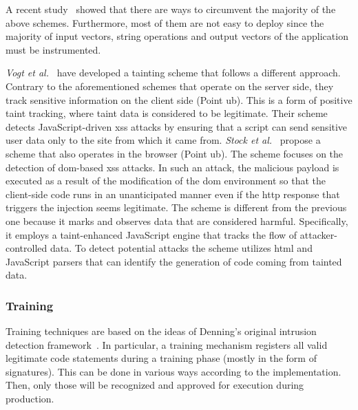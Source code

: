 \documentclass[conference]{IEEEtran}
\begin{document}
A recent study~\cite{NBR14} showed that there are ways to circumvent
the majority of the above schemes. Furthermore, most of them are not
easy to deploy since the majority of input vectors, string operations
and output vectors of the application must be instrumented.

{\it Vogt et al.}~\cite{VFJKKV07} have developed a tainting scheme
that follows a different approach. Contrary to the aforementioned
schemes that operate on the server side, they track sensitive
information on the client side (Point {\sc ub}). This is a form of
positive taint tracking, where taint data is considered to be
legitimate. Their scheme detects JavaScript-driven {\sc xss} attacks
by ensuring that a script can send sensitive user data only to the
site from which it came from.
{\it Stock et al.}~\cite{SLMS14} propose a scheme that also operates
in the browser (Point {\sc ub}). The scheme focuses on the detection of
{\sc dom}-based {\sc xss} attacks. In such an attack, the malicious
payload is executed as a result of the modification of the {\sc dom}
environment so that the client-side code runs in an unanticipated
manner even if the {\sc http} response that triggers the injection
seems legitimate. The scheme is different from the previous one
because it marks and observes data that are considered harmful.
Specifically, it employs a taint-enhanced JavaScript engine that
tracks the flow of attacker-controlled data. To detect potential
attacks the scheme utilizes {\sc html} and JavaScript parsers that can
identify the generation of code coming from tainted data.

\subsubsection{Training}
\label{sec:train}

Training techniques are based on the ideas of Denning's original
intrusion detection framework~\cite{Den87}. In particular, a training
mechanism registers all valid legitimate code statements during a
training phase (mostly in the form of signatures). This can
be done in various ways according to the implementation. Then, only
those will be recognized and approved for execution
during production.
\end{document}
